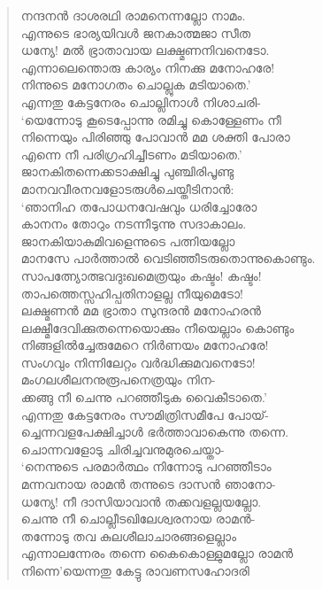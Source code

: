 \begin{verse}
നന്ദനന്‍ ദാശരഥി രാമനെന്നല്ലോ നാമം.\\
എന്നുടെ ഭാര്യയിവള്‍ ജനകാത്മജാ സീത\\
ധന്യേ! മല്‍ ഭ്രാതാവായ ലക്ഷ്മണനിവനെടോ.\\
എന്നാലെന്തൊരു കാര്യം നിനക്കു മനോഹരേ!\\
നിന്നുടെ മനോഗതം ചൊല്ലുക മടിയാതെ.’\\
എന്നതു കേട്ടനേരം ചൊല്ലിനാള്‍ നിശാചരി-\\
‘യെന്നോടു കൂടെപ്പോന്നു രമിച്ചു കൊള്ളേണം നീ\\
നിന്നെയും പിരിഞ്ഞു പോവാന്‍ മമ ശക്തി പോരാ\\
എന്നെ നീ പരിഗ്രഹിച്ചീടണം മടിയാതെ.’\\
ജാനകിതന്നെക്കടാക്ഷിച്ചു പുഞ്ചിരിപൂണ്ടു\\
മാനവവീരനവളോടരുള്‍ചെയ്തീടിനാന്‍:\\
‘ഞാനിഹ തപോധനവേഷവും ധരിച്ചോരോ\\
കാനനം തോറും നടന്നീടുന്നു സദാകാലം.\\
ജാനകിയാകുമിവളെന്നുടെ പത്നിയല്ലോ\\
മാനസേ പാര്‍ത്താല്‍ വെടിഞ്ഞീടരുതൊന്നുകൊണ്ടും.\\
സാപത്ന്യോത്ഭവദുഃഖമെത്രയും കഷ്ടം! കഷ്ടം!\\
താപത്തെസ്സഹിപ്പതിനാളല്ല നീയുമെടോ!\\
ലക്ഷ്മണന്‍ മമ ഭ്രാതാ സുന്ദരന്‍ മനോഹരന്‍\\
ലക്ഷ്മീദേവിക്കുതന്നെയൊക്കും നീയെല്ലാം കൊണ്ടും\\
നിങ്ങളില്‍ച്ചേരുമേറെ നിര്‍ണയം മനോഹരേ!\\
സംഗവും നിന്നിലേറ്റം വര്‍ദ്ധിക്കുമവനെടോ!\\
മംഗലശീലനനുരൂപനെത്രയും നിന-\\
ക്കങ്ങു നീ ചെന്നു പറഞ്ഞീടുക വൈകീടാതെ.’\\
എന്നതു കേട്ടനേരം സൗമിത്രിസമീപേ പോയ്-\\
ച്ചെന്നവളപേക്ഷിച്ചാള്‍ ഭര്‍ത്താവാകെന്നു തന്നെ.\\
ചൊന്നവളോടു ചിരിച്ചവനുമുരചെയ്താ-\\
‘നെന്നുടെ പരമാര്‍ത്ഥം നിന്നോടു പറഞ്ഞീടാം\\
മന്നവനായ രാമന്‍ തന്നുടെ ദാസന്‍ ഞാനോ-\\
ധന്യേ! നീ ദാസിയാവാന്‍ തക്കവളല്ലയല്ലോ.\\
ചെന്നു നീ ചൊല്ലീടഖിലേശ്വരനായ രാമന്‍-\\
തന്നോടു തവ കുലശീലാചാരങ്ങളെല്ലാം\\
എന്നാലന്നേരം തന്നെ കൈകൊള്ളുമല്ലോ രാമന്‍\\
നിന്നെ’യെന്നതു കേട്ടു രാവണസഹോദരി\\

\end{verse}

